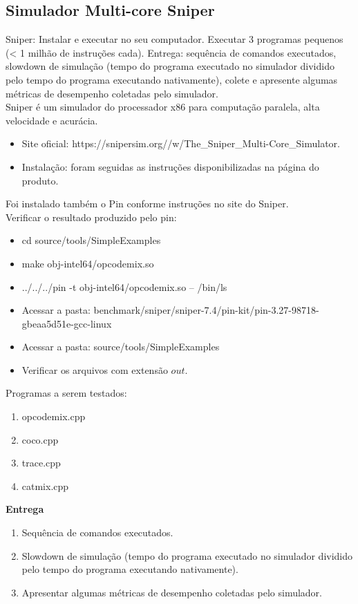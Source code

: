 
\subsection{Simulador Multi-core Sniper}

Sniper: Instalar e executar no seu computador. Executar 3 programas pequenos (< 1 milhão de instruções cada). Entrega: sequência de comandos executados, slowdown de simulação (tempo do programa executado no simulador dividido pelo tempo do programa executando nativamente), colete e apresente algumas métricas de desempenho coletadas pelo simulador. \\

Sniper é um simulador do processador x86 para computação paralela, alta velocidade e acurácia.

\begin{itemize}
    \item Site oficial: https://snipersim.org//w/The\_Sniper\_Multi-Core\_Simulator.
    \item Instalação: foram seguidas as instruções disponibilizadas na página do produto.
\end{itemize}

Foi instalado também o Pin conforme instruções no site do Sniper. \\


Verificar o resultado produzido pelo pin:

\begin{itemize}
    \item cd source/tools/SimpleExamples
    \item make obj-intel64/opcodemix.so
    \item ../../../pin -t obj-intel64/opcodemix.so -- /bin/ls
    \item Acessar a pasta: benchmark/sniper/sniper-7.4/pin-kit/pin-3.27-98718-gbeaa5d51e-gcc-linux
    \item Acessar a pasta: source/tools/SimpleExamples
    \item Verificar os arquivos com extensão $out$.
\end{itemize}


Programas a serem testados:

\begin{enumerate}
    \item opcodemix.cpp
    \item coco.cpp 
    \item trace.cpp
    \item catmix.cpp 
\end{enumerate}


\textbf{Entrega}

\begin{enumerate}
    \item Sequência de comandos executados.
    \item Slowdown de simulação (tempo do programa executado no simulador dividido pelo tempo do programa executando nativamente).
    \item Apresentar algumas métricas de desempenho coletadas pelo simulador.
\end{enumerate}
